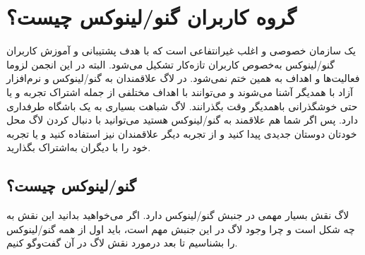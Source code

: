 \section{گروه کاربران گنو/لینوکس چیست؟}
یک سازمان خصوصی و اغلب غیرانتفاعی است که با هدف پشتیبانی و آموزش کاربران گنو/لینوکس
به‌خصوص کاربران تازه‌کار تشکیل می‌شود. البته در این انجمن لزوما فعالیت‌ها و اهداف به همین ختم نمی‌شود.
در لاگ علاقمندان به گنو/لینوکس و نرم‌افزار آزاد با همدیگر آشنا می‌شوند و می‌توانند با اهداف مختلفی از جمله
اشتراک تجربه و یا حتی خوشگذرانی باهمدیگر وقت بگذرانند. لاگ شباهت بسیاری به یک باشگاه طرفداری دارد.
پس اگر شما هم علاقمند به گنو/لینوکس هستید می‌توانید با دنبال کردن لاگ محل خودتان دوستان جدیدی
پیدا کنید و از تجربه دیگر علاقمندان نیز استفاده کنید و یا تجربه خود را با دیگران به‌اشتراک بگذارید.

\subsection{گنو/لینوکس چیست؟}
لاگ نقش بسیار مهمی در جنبش گنو/لینوکس دارد. اگر می‌خواهید بدانید این نقش به چه شکل است
و چرا وجود لاگ در این جنبش مهم است، باید اول از همه گنو/لینوکس را بشناسیم تا بعد درمورد
نقش لاگ در آن گفت‌وگو کنیم.

